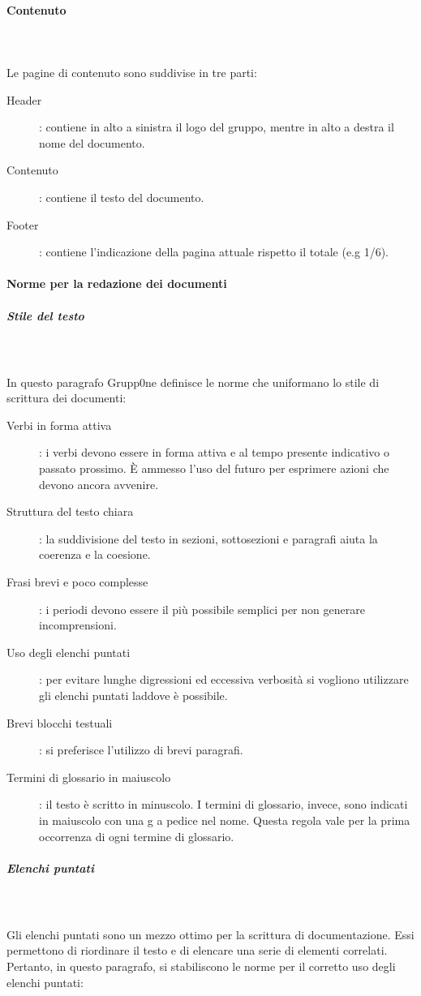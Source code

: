 \documentclass[../norme-di-progetto.tex]{subfiles}
\begin{document}
\paragraph{Contenuto}\mbox{}\\
\label{par:contenuto}
\\Le pagine di contenuto sono suddivise in tre parti:
\begin{description}
  \item [Header]: contiene in alto a sinistra il logo del gruppo, mentre in alto a destra il nome del documento.
  \item [Contenuto]: contiene il testo del documento.
  \item [Footer]: contiene l'indicazione della pagina attuale rispetto il totale (e.g 1/6).
\end{description}
\paragraph{Norme per la redazione dei documenti}
\label{par:norme per la redazione dei documenti}
\subparagraph{Stile del testo}\mbox{}\\
\label{subp:stile del testo}
\\In questo paragrafo Grupp0ne definisce le norme che uniformano lo stile di scrittura dei documenti:
\begin{description}
    \item [Verbi in forma attiva]: i verbi devono essere in forma attiva e al tempo presente indicativo o passato prossimo. È ammesso l'uso del futuro per esprimere azioni che devono ancora avvenire.
    \item [Struttura del testo chiara]: la suddivisione del testo in sezioni, sottosezioni e paragrafi aiuta la coerenza e la coesione.
    \item [Frasi brevi e poco complesse]: i periodi devono essere il più possibile semplici per non generare incomprensioni.
    \item [Uso degli elenchi puntati]: per evitare lunghe digressioni ed eccessiva verbosità si vogliono utilizzare gli elenchi puntati laddove è possibile.
    \item [Brevi blocchi testuali]: si preferisce l'utilizzo di brevi paragrafi.
    \item [Termini di glossario in maiuscolo]: il testo è scritto in minuscolo. I termini di glossario, invece, sono indicati in maiuscolo con una g a pedice nel nome. Questa regola vale per la prima occorrenza di ogni termine di glossario.
\end{description}
\subparagraph{Elenchi puntati}\mbox{}\\
\label{subp:elenchi puntati}
\\Gli elenchi puntati sono un mezzo ottimo per la scrittura di documentazione. Essi permettono di riordinare il testo e di elencare una serie di elementi correlati. Pertanto, in questo paragrafo, si stabiliscono le norme per il corretto uso degli elenchi puntati:
\end{document}
